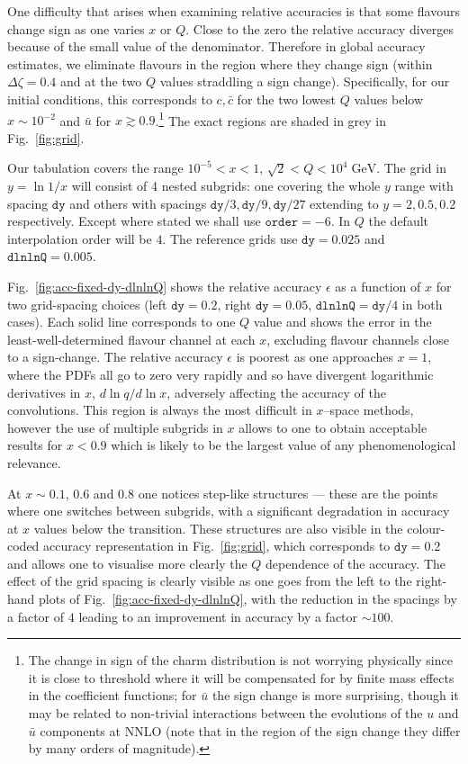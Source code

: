 \documentclass[12pt]{article}
\newcommand{\dy}{\ttt{dy}}
\newcommand{\dlnlnQ}{\ttt{dlnlnQ}}
\newcommand{\GeV}{\;\mathrm{GeV}}
\newcommand{\ttt}[1]{\texttt{#1}}
\begin{document}
One difficulty that arises when examining relative accuracies is that
some flavours change sign as one varies $x$ or $Q$. Close to the zero
the relative accuracy diverges because of the small value of the
denominator. Therefore in global accuracy estimates, we eliminate
flavours in the region where they change sign (within $\Delta
\zeta=0.4$ and at the two $Q$ values straddling a sign
change). Specifically, for our 
initial conditions, this corresponds to $c,\bar c$ for the two lowest
$Q$ values below $x\sim 10^{-2}$ and $\bar u$ for $x\gtrsim
0.9$.\footnote{The change in sign of the charm distribution is not
  worrying physically since it is close to threshold where it will be
  compensated for by finite mass effects in the coefficient functions;
  for $\bar u$ the sign change is more surprising, though it may be
  related to non-trivial interactions between the evolutions of the
  $u$ and $\bar u$ components at NNLO (note that in the region of the
  sign change they differ by many orders of magnitude).  } %
The exact regions are shaded in grey in Fig.~\ref{fig:grid}.

Our tabulation covers the range $10^{-5}<x<1$, $\sqrt{2} < Q<
10^4\GeV$. The grid in $y=\ln1/x$ will consist of 4 nested subgrids:
one covering the whole $y$ range with spacing $\ttt{dy}$ and others
with spacings $\ttt{dy}/3, \ttt{dy}/9, \ttt{dy}/27$ extending to
$y=2,0.5,0.2$ respectively. Except where stated we shall use
$\ttt{order}=-6$. In $Q$ the default interpolation order will be $4$.
The reference grids use $\dy=0.025$ and $\dlnlnQ=0.005$.

Fig.~\ref{fig:acc-fixed-dy-dlnlnQ} shows the relative accuracy
$\epsilon$ as a function of $x$ for two grid-spacing choices (left
$\dy=0.2$, right $\dy=0.05$, $\dlnlnQ=\dy/4$ in both cases). Each
solid line corresponds to one $Q$ value and shows the error in the
least-well-determined flavour channel at each $x$, excluding flavour
channels close to a sign-change. The relative accuracy $\epsilon$
is poorest as
one approaches $x=1$, where the PDFs all go to zero very rapidly and
so have divergent logarithmic derivatives in $x$, $d\ln q/d\ln x$,
adversely affecting the accuracy of the convolutions. This region is
always the most difficult in $x$--space methods, however the use of
multiple subgrids in $x$ allows to one to obtain acceptable results
for $x<0.9$ which is likely to be the largest value of any
phenomenological relevance. 

At $x\sim0.1$, $0.6$ and $0.8$ one notices
step-like structures --- these are the points where one switches
between subgrids, with a significant degradation in accuracy at $x$
values below the transition. These structures are also visible in the
colour-coded accuracy representation in Fig.~\ref{fig:grid}, which
corresponds to $\dy=0.2$ and allows one to visualise more clearly the
$Q$ dependence of the accuracy. The effect of the grid spacing is
clearly visible as one goes from the left to the right-hand plots of
Fig.~\ref{fig:acc-fixed-dy-dlnlnQ},
with the reduction in the spacings by a factor of $4$ leading to an
improvement in accuracy by a factor $\sim 100$.
\end{document}
